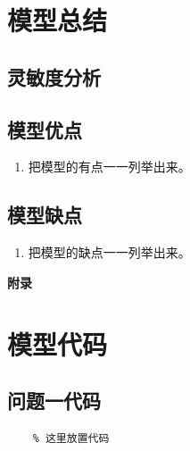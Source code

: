 \documentclass{cumcm}
\begin{document}
\section{模型总结}
\subsection{灵敏度分析}
\subsection{模型优点}
\begin{enumerate}
	\item 把模型的有点一一列举出来。
\end{enumerate}

\subsection{模型缺点}
\begin{enumerate}
	\item 把模型的缺点一一列举出来。
\end{enumerate}




\newpage
\appendix
\textbf{附录}
\section{模型代码}
\subsection{问题一代码}
\begin{lstlisting}
	% 这里放置代码
\end{lstlisting}
\end{document}
